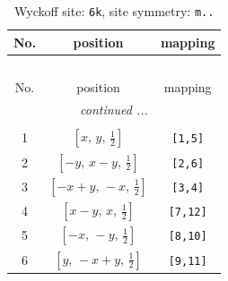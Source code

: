 \documentclass[fleqn,8pt]{jsarticle}
\begin{document}
\renewcommand{\arraystretch}{1.2}
\begin{longtable}{ccc}
\caption{Wyckoff site: {\tt 6k}, site symmetry: {\tt m..}}
 \\
 \hline \hline
No. & position & mapping \\ \hline \endfirsthead

\multicolumn{2}{l}{\tablename\ \thetable{}} \\
 \hline \hline
No. & position & mapping \\ \hline \endhead

 \hline \hline
\multicolumn{2}{r}{\footnotesize\it continued ...} \\ \endfoot

 \hline \hline
\multicolumn{2}{r}{} \\ \endlastfoot

1 & $\left[ x,\, y,\, \frac{1}{2} \right]$ & {\tt [1,5]} \\ \hline
2 & $\left[ - y,\, x - y,\, \frac{1}{2} \right]$ & {\tt [2,6]} \\ \hline
3 & $\left[ - x + y,\, - x,\, \frac{1}{2} \right]$ & {\tt [3,4]} \\ \hline
4 & $\left[ x - y,\, x,\, \frac{1}{2} \right]$ & {\tt [7,12]} \\ \hline
5 & $\left[ - x,\, - y,\, \frac{1}{2} \right]$ & {\tt [8,10]} \\ \hline
6 & $\left[ y,\, - x + y,\, \frac{1}{2} \right]$ & {\tt [9,11]} \\
\end{longtable}
\renewcommand{\arraystretch}{1.2}
\end{document}
